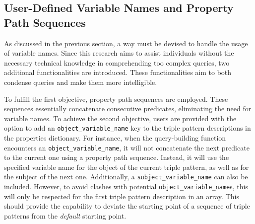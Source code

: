 \subsection{User-Defined Variable Names and Property Path Sequences}
\label{subsec:variable_names_property_path_sequences}

As discussed in the previous section, a way must be devised to handle the usage of variable names. Since this research aims to assist individuals without the necessary technical knowledge in comprehending too complex queries, two additional functionalities are introduced. These functionalities aim to both condense queries and make them more intelligible.

To fulfill the first objective, property path sequences are employed. These sequences essentially concatenate consecutive predicates, eliminating the need for variable names. To achieve the second objective, users are provided with the option to add an \texttt{object_variable_name} key to the triple pattern descriptions in the properties dictionary. For instance, when the query-building function encounters an \texttt{object_variable_name}, it will not concatenate the next predicate to the current one using a property path sequence. Instead, it will use the specified variable name for the object of the current triple pattern, as well as for the subject of the next one. Additionally, a \texttt{subject_variable_name} can also be included. However, to avoid clashes with potential \texttt{object_variable_name}s, this will only be respected for the first triple pattern description in an array. This should provide the capability to deviate the starting point of a sequence of triple patterns from the \textit{default} starting point.

